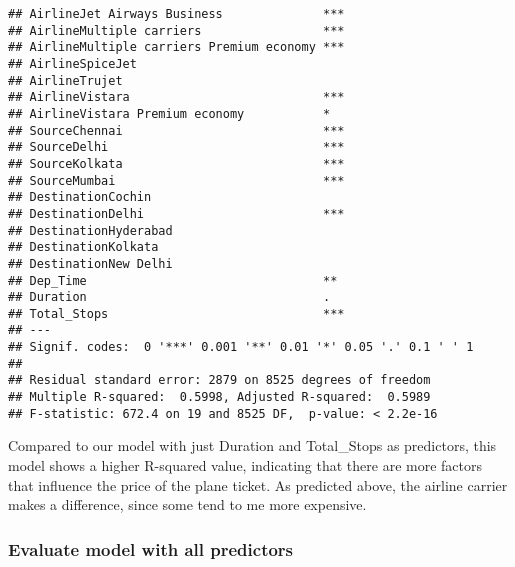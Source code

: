 \documentclass[
]{article}
\newenvironment{Shaded}{\begin{snugshade}}{\end{snugshade}}
\newcommand{\AttributeTok}[1]{\textcolor[rgb]{0.77,0.63,0.00}{#1}}
\newcommand{\DecValTok}[1]{\textcolor[rgb]{0.00,0.00,0.81}{#1}}
\newcommand{\FunctionTok}[1]{\textcolor[rgb]{0.00,0.00,0.00}{#1}}
\newcommand{\NormalTok}[1]{#1}
\newcommand{\OtherTok}[1]{\textcolor[rgb]{0.56,0.35,0.01}{#1}}
\newcommand{\SpecialCharTok}[1]{\textcolor[rgb]{0.00,0.00,0.00}{#1}}
\newcommand{\StringTok}[1]{\textcolor[rgb]{0.31,0.60,0.02}{#1}}
\begin{document}
\begin{verbatim}
## AirlineJet Airways Business              ***
## AirlineMultiple carriers                 ***
## AirlineMultiple carriers Premium economy ***
## AirlineSpiceJet                             
## AirlineTrujet                               
## AirlineVistara                           ***
## AirlineVistara Premium economy           *  
## SourceChennai                            ***
## SourceDelhi                              ***
## SourceKolkata                            ***
## SourceMumbai                             ***
## DestinationCochin                           
## DestinationDelhi                         ***
## DestinationHyderabad                        
## DestinationKolkata                          
## DestinationNew Delhi                        
## Dep_Time                                 ** 
## Duration                                 .  
## Total_Stops                              ***
## ---
## Signif. codes:  0 '***' 0.001 '**' 0.01 '*' 0.05 '.' 0.1 ' ' 1
## 
## Residual standard error: 2879 on 8525 degrees of freedom
## Multiple R-squared:  0.5998, Adjusted R-squared:  0.5989 
## F-statistic: 672.4 on 19 and 8525 DF,  p-value: < 2.2e-16
\end{verbatim}

Compared to our model with just Duration and Total\_Stops as predictors,
this model shows a higher R-squared value, indicating that there are
more factors that influence the price of the plane ticket. As predicted
above, the airline carrier makes a difference, since some tend to me
more expensive.

\hypertarget{evaluate-model-with-all-predictors}{%
\subsubsection{Evaluate model with all
predictors}\label{evaluate-model-with-all-predictors}}

\begin{Shaded}
\end{Shaded}
\end{document}
